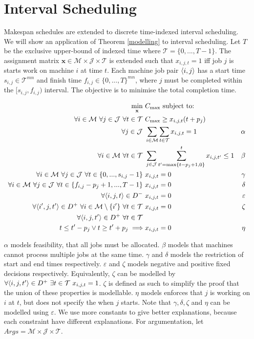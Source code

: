 \section{Interval Scheduling}
\label{interval}

Makespan schedules are extended to discrete time-indexed interval scheduling. We will show an application of Theorem \ref{modelling} to interval scheduling. Let $T$ be the exclusive upper-bound of indexed time where $\mathcal{T}=\{0,...,T-1\}$. The assignment matrix $\mathbf{x}\in\mathcal{M}\times\mathcal{J}\times\mathcal{T}$ is extended such that $x_{i,j,t}=1$ iff job $j$ is starts work on machine $i$ at time $t$. Each machine job pair $\langle{i},{j}\rangle$ has a start time $s_{i,j}\in\mathcal{T}^{mn}$ and finish time $f_{i,j}\in\{0,...,T\}^{mn}$, where $j$ must be completed within the $[s_{i,j},f_{i,j})$ interval. The objective is to minimise the total completion time.

\begin{align*}
	\min_{\mathbf{x}}\ &C_{\max}\text{ subject to:}\\
	\forall i\in\mathcal{M}\ \forall j\in\mathcal{J}\ \forall t\in\mathcal{T}\ &C_{\max}\geq x_{i,j,t}(t+p_j)\\
	\forall j\in\mathcal{J}\ &\sum_{i\in\mathcal{M}}\sum_{t\in\mathcal{T}}x_{i,j,t}=1&\alpha\\
	\forall i\in\mathcal{M}\ \forall t\in\mathcal{T}\ &\sum_{j\in\mathcal{J}}\sum_{t'=\max\{t-p_j+1,0\}}^t x_{i,j,t'}\leq 1&\beta\\
	\forall i\in\mathcal{M}\ \forall j\in\mathcal{J}\ \forall t\in\{0,...,s_{i,j}-1\}\ &x_{i,j,t}=0&\gamma\\
	\forall i\in\mathcal{M}\ \forall j\in\mathcal{J}\ \forall t\in\{f_{i,j}-p_j+1,...,T-1\}\ &x_{i,j,t}=0&\delta\\
	\forall\triple{i}{j}{t}\in D^-\ &x_{i,j,t}=0&\varepsilon\\
	\forall\triple{i'}{j}{t'}\in D^+\ \forall i\in\mathcal{M}\setminus\{i'\}\ \forall t\in\mathcal{T}\ &x_{i,j,t}=0&\zeta\\
	\forall\triple{i}{j}{t'}\in D^+\ \forall t\in\mathcal{T}\ &&\\
	t\leq t'-p_j\lor t\geq t'+p_j\implies&x_{i,j,t}=0&\eta\\
\end{align*}

$\alpha$ models feasibility, that all jobs must be allocated. $\beta$ models that machines cannot process multiple jobs at the same time. $\gamma$ and $\delta$ models the restriction of start and end times respectively. $\varepsilon$ and $\zeta$ models negative and positive fixed decisions respectively. Equivalently, $\zeta$ can be modelled by $\forall\langle{i},{j},{t'}\rangle\in D^+\ \exists t\in\mathcal{T}\ x_{i,j,t}=1$. $\zeta$ is defined as such to simplify the proof that the union of these properties is modellable. $\eta$ models enforces that $j$ is working on $i$ at $t$, but does not specify the when $j$ starts. Note that $\gamma,\delta,\zeta$ and $\eta$ can be modelled using $\varepsilon$. We use more constants to give better explanations, because each constraint have different explanations. For argumentation, let $Args=\mathcal{M}\times\mathcal{J}\times\mathcal{T}$.

